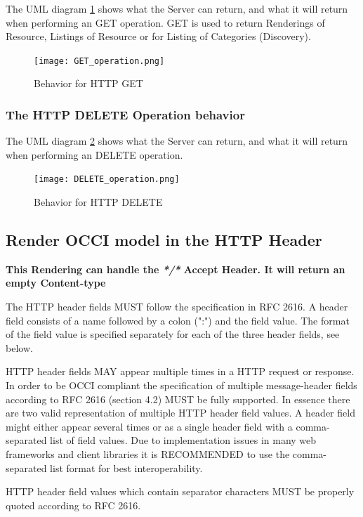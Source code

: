 \documentclass[10pt,a4paper]{article}
\begin{document}
The UML diagram \ref{fig:get_operation} shows what the Server can return, and what it will return when performing an GET operation. GET is used to return Renderings of Resource, Listings of Resource or for Listing of Categories (Discovery).

\clearpage
\begin{figure}[!h]
	\centering
	\texttt{[image: GET\_operation.png]}
	\caption{Behavior for HTTP GET}
	\label{fig:get_operation}
\end{figure}

\subsubsection{The HTTP DELETE Operation behavior}

The UML diagram \ref{fig:del_operation} shows what the Server can return, and what it will return when performing an DELETE operation.

\clearpage
\begin{figure}[!h]
	\centering
	\texttt{[image: DELETE\_operation.png]}
	\caption{Behavior for HTTP DELETE}
	\label{fig:del_operation}
\end{figure}

\subsection{Render OCCI model in the HTTP Header}
\label{sec:http_header}

\textbf{This Rendering can handle the \textit{*/*} Accept Header. It will return an empty Content-type}

The HTTP header fields MUST follow the specification in RFC 2616. A header field consists of a name followed by a colon (":") and the field value. The format of the field value is specified separately for each of the three header fields, see below.

HTTP header fields MAY appear multiple times in a HTTP request or response. In order to be OCCI compliant the specification of multiple message-header fields according to RFC 2616 (section 4.2) MUST be fully supported. In essence there are two valid representation of multiple HTTP header field values. A header field might either appear several times or as a single header field with a comma-separated list of field values. Due to implementation issues in many web frameworks and client libraries it is RECOMMENDED to use the comma-separated list format for best interoperability.

HTTP header field values which contain separator characters MUST be properly quoted according to RFC 2616.
\end{document}
